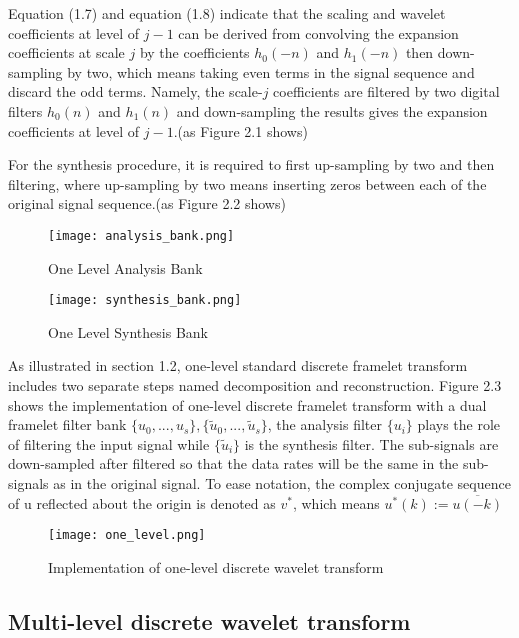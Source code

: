 Equation (1.7) and equation (1.8) indicate that the scaling and wavelet coefficients at level of $j-1$ can be derived from convolving the expansion coefficients at scale $j$ by the coefficients $h_0(-n)$ and $h_1(-n)$ then down-sampling by two, which means taking even terms in the signal sequence and discard the odd terms. Namely, the scale-$j$ coefficients are filtered by two digital filters $h_0(n)$ and $h_1(n)$ and down-sampling the results gives the expansion coefficients at level of $j-1$.(as Figure 2.1 shows)

For the synthesis procedure, it is required to first up-sampling by two and then filtering, where up-sampling by two means inserting zeros between each of the original signal sequence.(as Figure 2.2 shows)
 \begin{figure}[h]
  \centering
  \begin{minipage}[c]{0.5\textwidth}
\centering
\texttt{[image: analysis\_bank.png]}
\caption{One Level Analysis Bank}
\end{minipage}%
\begin{minipage}[c]{0.5\textwidth}
\centering
  \texttt{[image: synthesis\_bank.png]}
\caption{One Level Synthesis Bank}
  \end{minipage}

\end{figure}


As illustrated in section 1.2, one-level standard discrete framelet transform includes two separate steps named decomposition and reconstruction. Figure 2.3 shows the implementation of one-level discrete framelet transform with a dual framelet filter bank $\{u_0,...,u_s\},\{\tilde{u}_0,...,\tilde{u}_s\}$, the analysis filter $\{u_i\}$ plays the role of filtering the input signal while $\{\tilde{u}_i\}$ is the synthesis filter. The sub-signals are down-sampled after filtered so that the data rates will be the same in the sub-signals as in the original signal. To ease notation, the complex conjugate sequence of u reflected about the origin is denoted as $v^*$, which means $u^*(k) := \overline{u(-k)} $
\begin{figure}[htb]
\centering
\texttt{[image: one\_level.png]}
\caption{Implementation of one-level discrete wavelet transform}
\end{figure}

\subsection{Multi-level discrete wavelet transform}

